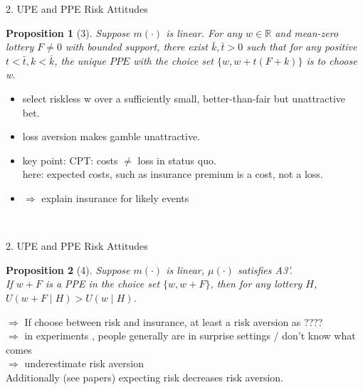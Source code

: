 \documentclass[11pt,aspectratio=169]{beamer}
\newtheorem{proposition}{Proposition}
\begin{document}
\begin{frame}{2. UPE and PPE Risk Attitudes}
    \begin{proposition}[3] 
    Suppose $m(\cdot)$ is linear. For any $w \in \mathbb{R}$ and mean-zero lottery $F \neq 0$ with bounded support, 
    there exist $\bar{k}, \bar{t}>0$ such that for any positive $t<\bar{t}, k<\bar{k}$, 
    the unique $P P E$ with the choice set $\{w, w+t(F+k)\}$ is to choose w.\\
    \end{proposition}
    \begin{itemize}
        \item select riskless w over a sufficiently small, better-than-fair but unattractive bet.\medskip
        \item loss aversion makes gamble unattractive.\medskip
        \item key point: CPT: costs $\neq $ loss in status quo.\\
        here: expected costs, such as insurance premium is a cost, not a loss.\medskip
        \item $\Rightarrow $ explain insurance for likely events  \medskip
	\end{itemize}
    \hspace*{\fill} \\  
\end{frame}

\begin{frame}{2. UPE and PPE Risk Attitudes}
    \begin{proposition}[4] 
        Suppose $m(\cdot)$ is linear, $\mu(\cdot)$ satisfies A3'. \\
        If $w+F$ is a PPE in the choice set $\{w, w+F\}$, then for any lottery $H$, $U(w+F \mid H)>U(w \mid H)$.\\
    \end{proposition}
    $\Rightarrow$ If choose between risk and insurance, at least a risk aversion as ????\\
    $\Rightarrow$ in experiments , people generally are in surprise settings / don't know what comes\\
    $\Rightarrow$ underestimate risk aversion\\
    Additionally (see papers) expecting risk decreases risk aversion.
\end{frame}
\end{document}
